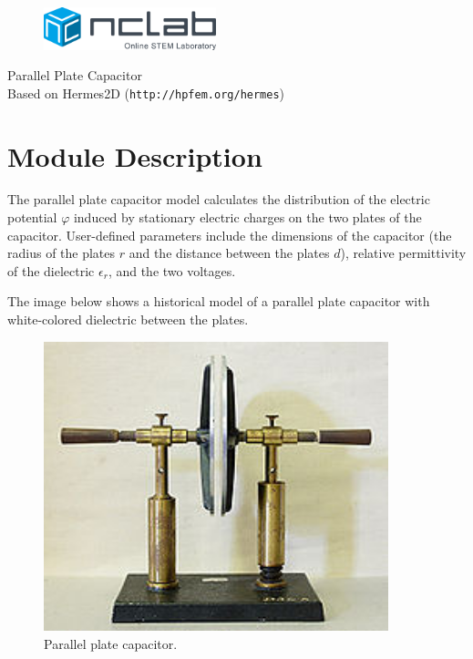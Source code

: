 \documentclass{article}
\begin{document}
\large

\vbox{}
\vspace{-2cm}
\begin{figure}[!ht]
\includegraphics[width=5cm]{img/logo.png}
\vspace{4mm}
\end{figure}
\noindent
\begin{center}
{\Huge Parallel Plate Capacitor}\\[2mm]
Based on Hermes2D ({\tt http://hpfem.org/hermes})\\[6mm]
\end{center}
\section{Module Description}

The parallel plate capacitor model calculates the distribution of the electric 
potential $\varphi$ induced by stationary electric charges on the two plates of the capacitor.
User-defined parameters include the dimensions of the capacitor (the radius of the plates $r$ 
and the distance between the plates $d$), relative permittivity of the dielectric $\epsilon_r$, 
and the two voltages.

The image below shows a historical model of a parallel plate capacitor with white-colored 
dielectric between the plates.
 

\begin{figure}[!ht]
\begin{center}
\includegraphics[width=10cm]{img/capacitor.png}
\caption{Parallel plate capacitor.}
\vspace{4mm}
\end{center}
\end{figure}
\noindent
\end{document}
